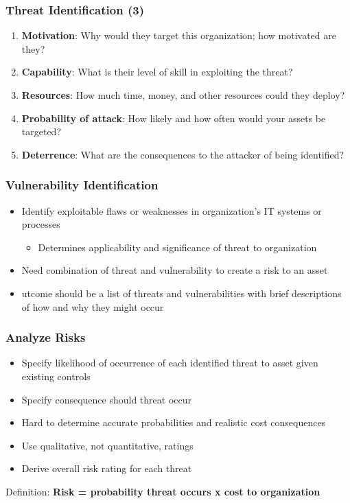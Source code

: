 \documentclass[xcolor ={table,usenames,dvipsnames}]{beamer}
\theoremstyle{definition}
\begin{document}
	\begin{frame}
		\frametitle{Threat Identification (3)}
		\begin{enumerate}
			\item  \textbf{Motivation}: Why would they target this organization; how motivated are they?
			\item \textbf{Capability}: What is their level of skill in exploiting the threat?
			\item \textbf{Resources}: How much time, money, and other resources could they deploy?
			\item \textbf{Probability of attack}: How likely and how often would your assets be targeted?
			\item \textbf{Deterrence}: What are the consequences to the attacker of being identified?	
		\end{enumerate}
	\end{frame}
	
	\begin{frame}
		\frametitle{Vulnerability Identification}
		\begin{itemize}
			\item Identify exploitable flaws or weaknesses in organization’s IT systems or processes
			\begin{itemize}
				\item Determines applicability and significance of threat to organization
			\end{itemize}
			\item Need combination of threat and vulnerability to create a risk to an asset
			\item utcome should be a list of threats and vulnerabilities with brief descriptions of how and why they might occur
		\end{itemize}
	\end{frame}

	\begin{frame}
		\frametitle{Analyze Risks}
		\begin{itemize}
			\item Specify likelihood of occurrence of each identified threat to asset given existing controls
			\item Specify consequence should threat occur
			\item Hard to determine accurate               probabilities and realistic cost          consequences
			\item Use qualitative, not quantitative, ratings 
			\item Derive overall risk rating for each threat
		\end{itemize}
		\begin{alertblock}{Definition:}
			\textbf{Risk = probability threat occurs x cost to organization}
		\end{alertblock}
	\end{frame}
\end{document}
